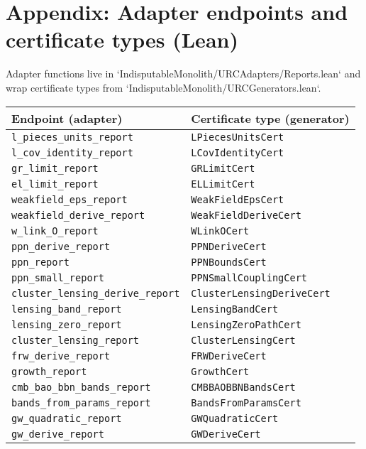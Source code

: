 \documentclass[11pt]{article}
\begin{document}
\section*{Appendix: Adapter endpoints and certificate types (Lean)}
Adapter functions live in `IndisputableMonolith/URCAdapters/Reports.lean` and wrap certificate types from `IndisputableMonolith/URCGenerators.lean`.
\begin{center}
\begin{tabular}{l l}
\hline
Endpoint (adapter) & Certificate type (generator) \\
\hline
\texttt{l\_pieces\_units\_report} & \texttt{LPiecesUnitsCert} \\
\texttt{l\_cov\_identity\_report} & \texttt{LCovIdentityCert} \\
\texttt{gr\_limit\_report} & \texttt{GRLimitCert} \\
\texttt{el\_limit\_report} & \texttt{ELLimitCert} \\
\texttt{weakfield\_eps\_report} & \texttt{WeakFieldEpsCert} \\
\texttt{weakfield\_derive\_report} & \texttt{WeakFieldDeriveCert} \\
\texttt{w\_link\_O\_report} & \texttt{WLinkOCert} \\
\texttt{ppn\_derive\_report} & \texttt{PPNDeriveCert} \\
\texttt{ppn\_report} & \texttt{PPNBoundsCert} \\
\texttt{ppn\_small\_report} & \texttt{PPNSmallCouplingCert} \\
\texttt{cluster\_lensing\_derive\_report} & \texttt{ClusterLensingDeriveCert} \\
\texttt{lensing\_band\_report} & \texttt{LensingBandCert} \\
\texttt{lensing\_zero\_report} & \texttt{LensingZeroPathCert} \\
\texttt{cluster\_lensing\_report} & \texttt{ClusterLensingCert} \\
\texttt{frw\_derive\_report} & \texttt{FRWDeriveCert} \\
\texttt{growth\_report} & \texttt{GrowthCert} \\
\texttt{cmb\_bao\_bbn\_bands\_report} & \texttt{CMBBAOBBNBandsCert} \\
\texttt{bands\_from\_params\_report} & \texttt{BandsFromParamsCert} \\
\texttt{gw\_quadratic\_report} & \texttt{GWQuadraticCert} \\
\texttt{gw\_derive\_report} & \texttt{GWDeriveCert} \\

\end{tabular}
\end{center}
\end{document}
